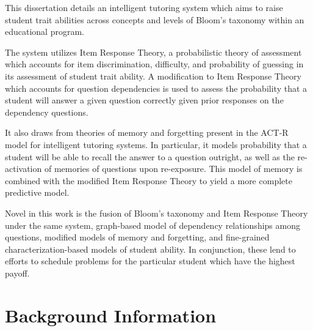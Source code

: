 \documentclass[12pt,letterpaper]{lsuetd}
\begin{document}
\renewenvironment{abstract}{{\hspace{-2.2em} \huge \textbf{\abstractname}} \par}{\pagebreak}
\begin{abstract}
\vspace{0.55ex}
\doublespacing

This dissertation details an intelligent tutoring system which aims to raise
student trait abilities across concepts and levels of Bloom’s taxonomy within
an educational program.

The system utilizes Item Response Theory, a probabilistic theory of assessment
which accounts for item discrimination, difficulty, and probability of guessing
in its assessment of student trait ability.  A modification to Item Response
Theory which accounts for question dependencies is used to assess the
probability that a student will answer a given question correctly given prior
responses on the dependency questions.

It also draws from theories of memory and forgetting present in the ACT-R model
for intelligent tutoring systems.  In particular, it models probability that
a student will be able to recall the answer to a question outright, as well
as the re-activation of memories of questions upon re-exposure.  This model
of memory is combined with the modified Item Response Theory to yield a more
complete predictive model.

Novel in this work is the fusion of Bloom's taxonomy and Item Response Theory
under the same system, graph-based model of dependency relationships among
questions, modified models of memory and forgetting, and fine-grained
characterization-based models of student ability.  In conjunction, these lend
to efforts to schedule problems for the particular student which have the
highest payoff.

\end{abstract}

\singlespacing
\setlength{\textfloatsep}{12pt plus 2pt minus 2pt}
\setlength{\intextsep}{6pt plus 2pt minus 2pt}
\chapter{Background Information}
\doublespacing

\pagebreak
\singlespacing
\end{document}
